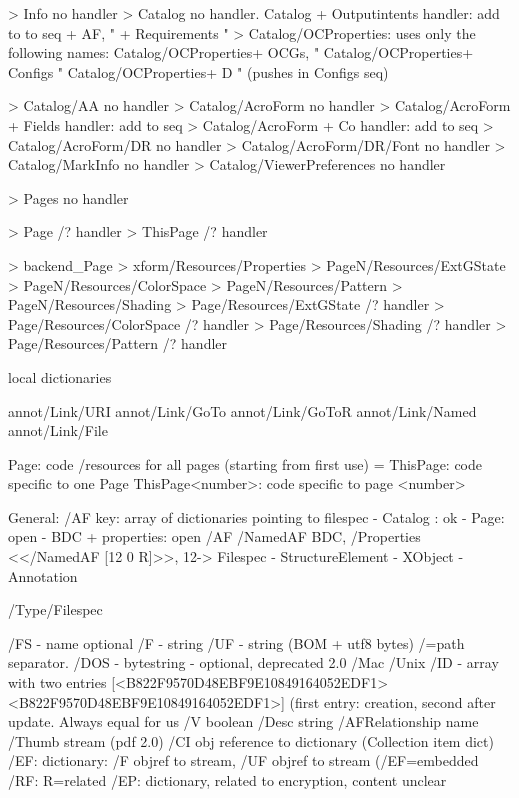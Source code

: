 >  {Info}                                 no handler
>  {Catalog}                              no handler.
   {Catalog}             + Outputintents  handler: add to to seq
                         + AF,             "
                         + Requirements    "
>  {Catalog/OCProperties}: uses only the following names:
   {Catalog/OCProperties}+ OCGs,           "
   {Catalog/OCProperties}+ Configs         "
   {Catalog/OCProperties}+ D               " (pushes in Configs seq)

>  {Catalog/AA}                            no handler
>  {Catalog/AcroForm}                      no handler
>  {Catalog/AcroForm}    + Fields          handler: add to seq
>  {Catalog/AcroForm}    + Co              handler: add to seq
>  {Catalog/AcroForm/DR}                   no handler
>  {Catalog/AcroForm/DR/Font}              no handler
>  {Catalog/MarkInfo}                      no handler
>  {Catalog/ViewerPreferences}             no handler

>  {Pages}                                 no handler

>  {Page}                                /? handler
>  {ThisPage}                            /? handler

>  {backend_Page}
>  {xform/Resources/Properties}
>  {PageN/Resources/ExtGState}
>  {PageN/Resources/ColorSpace}
>  {PageN/Resources/Pattern}
>  {PageN/Resources/Shading}
>  {Page/Resources/ExtGState}           /? handler
>  {Page/Resources/ColorSpace}          /? handler
>  {Page/Resources/Shading}             /? handler
>  {Page/Resources/Pattern}             /? handler


local dictionaries

annot/Link/URI
annot/Link/GoTo
annot/Link/GoToR
annot/Link/Named
annot/Link/File



Page:             code /resources for all pages (starting from first use) = \pageattr
ThisPage:         code specific to one Page
ThisPage<number>: code specific to page <number>


General: /AF key: array of dictionaries pointing to filespec
- Catalog : ok
- Page: open
- BDC + properties: open  /AF /NamedAF BDC,  /Properties <</NamedAF [12 0 R]>>, 12-> Filespec
- StructureElement
- XObject
- Annotation


/Type/Filespec%

/FS  - name optional
/F   - string
/UF  - string (BOM + utf8 bytes) /=path separator.
/DOS - bytestring - optional, deprecated 2.0
/Mac
/Unix
/ID - array with two entries [<B822F9570D48EBF9E10849164052EDF1> <B822F9570D48EBF9E10849164052EDF1>]
      (first entry: creation, second after update. Always equal for us
/V boolean
/Desc string
/AFRelationship name
/Thumb stream (pdf 2.0)
/CI  obj reference to dictionary (Collection item dict)
/EF: dictionary: /F objref to stream, /UF objref to stream (/EF=embedded
/RF: R=related
/EP: dictionary, related to encryption, content unclear



